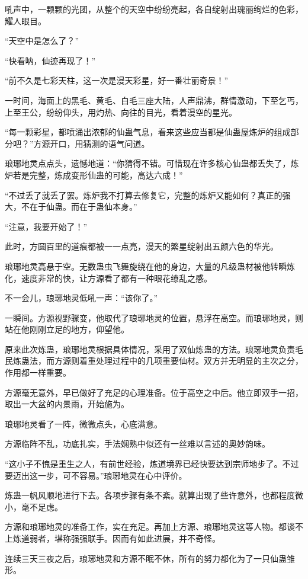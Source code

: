 \begin{this_body}
吼声中，一颗颗的光团，从整个的天空中纷纷亮起，各自绽射出瑰丽绚烂的色彩，耀人眼目。

“天空中是怎么了？”

“快看呐，仙迹再现了！”

“前不久是七彩天柱，这一次是漫天彩星，好一番壮丽奇景！”

一时间，海面上的黑毛、黄毛、白毛三座大陆，人声鼎沸，群情激动，下至乞丐，上至王公，纷纷仰头，用灼热、向往的目光，看着漫空的星光。

“每一颗彩星，都喷涌出浓郁的仙蛊气息，看来这些应当都是仙蛊屋炼炉的组成部分吧？”方源开口，用猜测的语气问道。

琅琊地灵点点头，遗憾地道：“你猜得不错。可惜现在许多核心仙蛊都丢失了，炼炉若是完整，炼成变形仙蛊的可能，高达六成！”

“不过丢了就丢了罢。炼炉我不打算去修复它，完整的炼炉又能如何？真正的强大，不在于仙蛊。而在于蛊仙本身。”

“注意，我要开始了！”

此时，方圆百里的道痕都被一一点亮，漫天的繁星绽射出五颜六色的华光。

琅琊地灵高悬于空。无数蛊虫飞舞旋绕在他的身边，大量的凡级蛊材被他转瞬炼化，速度非常的快，让方源看了都有一种眼花缭乱之感。

不一会儿，琅琊地灵低吼一声：“该你了。”

一瞬间。方源视野骤变，他取代了琅琊地灵的位置，悬浮在高空。而琅琊地灵，则站在他刚刚立足的地方，仰望他。

原来此次炼蛊，琅琊地灵根据具体情况，采用了双仙炼蛊的方法。琅琊地灵负责毛民炼蛊法，而方源则着重处理过程中的几项重要仙材。双方并无明显的主次之分，作用都一样重要。

方源毫无意外，早已做好了充足的心理准备。位于高空之中后。他立即双手一招，取出一大盆的内景雨，开始施为。

琅琊地灵看了一阵，微微点头，心底满意。

方源临阵不乱，功底扎实，手法娴熟中似还有一丝难以言述的奥妙韵味。

“这小子不愧是重生之人，有前世经验，炼道境界已经快要达到宗师地步了。不过要迈出这一步，可不容易。”琅琊地灵在心中评价。

炼蛊一帆风顺地进行下去。各项步骤有条不紊。就算出现了些许意外，也都程度微小，毫不足虑。

方源和琅琊地灵的准备工作，实在充足。再加上方源、琅琊地灵这等人物。都谈不上炼道弱者，堪称强强联手。因而有如此进展，并不奇怪。

连续三天三夜之后，琅琊地灵和方源不眠不休，所有的努力都化为了一只仙蛊雏形。


\end{this_body}

